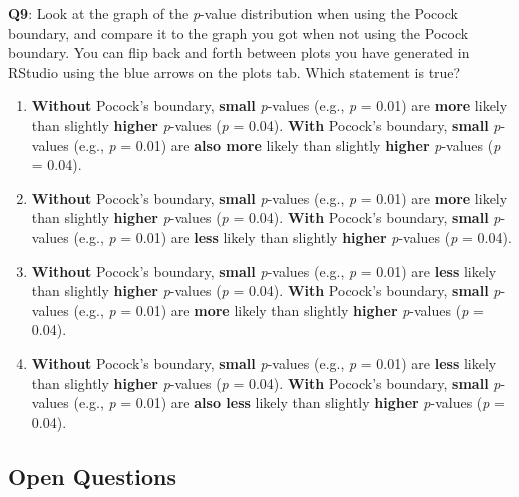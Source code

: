 \documentclass[
  oneside]{book}
\providecommand{\tightlist}{%
  \setlength{\itemsep}{0pt}\setlength{\parskip}{0pt}}
\begin{document}
\textbf{Q9}: Look at the graph of the \emph{p}-value distribution when using the Pocock boundary, and compare it to the graph you got when not using the Pocock boundary. You can flip back and forth between plots you have generated in RStudio using the blue arrows on the plots tab. Which statement is true?

\begin{enumerate}
\def\labelenumi{\Alph{enumi})}
\tightlist
\item
  \textbf{Without} Pocock's boundary, \textbf{small} \emph{p}-values (e.g., \emph{p} = 0.01) are
  \textbf{more} likely than slightly \textbf{higher} \emph{p}-values (\emph{p} = 0.04). \textbf{With}
  Pocock's boundary, \textbf{small} \emph{p}-values (e.g., \emph{p} = 0.01) are \textbf{also more}
  likely than slightly \textbf{higher} \emph{p}-values (\emph{p} = 0.04).
\item
  \textbf{Without} Pocock's boundary, \textbf{small} \emph{p}-values (e.g., \emph{p} = 0.01) are
  \textbf{more} likely than slightly \textbf{higher} \emph{p}-values (\emph{p} = 0.04). \textbf{With}
  Pocock's boundary, \textbf{small} \emph{p}-values (e.g., \emph{p} = 0.01) are \textbf{less} likely
  than slightly \textbf{higher} \emph{p}-values (\emph{p} = 0.04).
\item
  \textbf{Without} Pocock's boundary, \textbf{small} \emph{p}-values (e.g., \emph{p} = 0.01) are
  \textbf{less} likely than slightly \textbf{higher} \emph{p}-values (\emph{p} = 0.04). \textbf{With}
  Pocock's boundary, \textbf{small} \emph{p}-values (e.g., \emph{p} = 0.01) are \textbf{more} likely
  than slightly \textbf{higher} \emph{p}-values (\emph{p} = 0.04).
\item
  \textbf{Without} Pocock's boundary, \textbf{small} \emph{p}-values (e.g., \emph{p} = 0.01) are
  \textbf{less} likely than slightly \textbf{higher} \emph{p}-values (\emph{p} = 0.04). \textbf{With}
  Pocock's boundary, \textbf{small} \emph{p}-values (e.g., \emph{p} = 0.01) are \textbf{also less}
  likely than slightly \textbf{higher} \emph{p}-values (\emph{p} = 0.04).
\end{enumerate}

\hypertarget{open-questions-1}{%
\subsection{Open Questions}\label{open-questions-1}}
\end{document}
